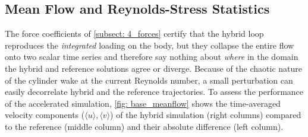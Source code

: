 \subsection{Mean Flow and Reynolds-Stress Statistics}
\label{subsect: 4_meanflow_rst}

The force coefficients of \autoref{subsect: 4_forces} certify that the hybrid loop reproduces the \emph{integrated} loading on the body, but they collapse the entire flow onto two scalar time series and therefore say nothing about \emph{where} in the domain the hybrid and reference solutions agree or diverge. Because of the chaotic nature of the cylinder wake at the current Reynolds number, a small perturbation can easily decorrelate hybrid and the reference trajectories. To assess the performance of the accelerated simulation, \autoref{fig: base_meanflow} shows the time-averaged velocity components ($\langle u\rangle, \langle v\rangle$) of the hybrid simulation (right columns) compared to the reference (middle column) and their absolute difference (left column).

